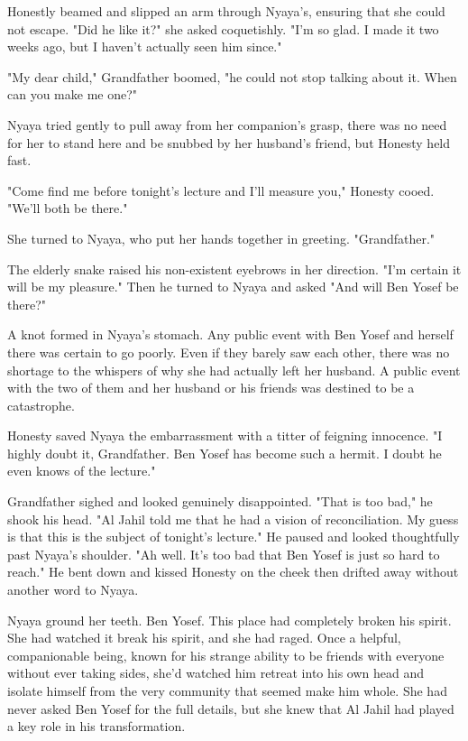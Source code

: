 \documentclass{amsart}
\begin{document}
Honestly beamed and slipped an arm through Nyaya's, ensuring that she could not escape. "Did he like it?" she asked coquetishly. "I'm so glad. I made it two weeks ago, but I haven't actually seen him since."

"My dear child," Grandfather boomed, "he could not stop talking about it. When can you make me one?"

Nyaya tried gently to pull away from her companion's grasp, there was no need for her to stand here and be snubbed by her husband's friend, but Honesty held fast. 

"Come find me before tonight's lecture and I'll measure you," Honesty cooed. "We'll both be there." 

She turned to Nyaya, who put her hands together in greeting. "Grandfather." 

The elderly snake raised his non-existent eyebrows in her direction. "I'm certain it will be my pleasure." Then he turned to Nyaya and asked "And will Ben Yosef be there?"

A knot formed in Nyaya's stomach. Any public event with Ben Yosef and herself there was certain to go poorly. Even if they barely saw each other, there was no shortage to the whispers of why she had actually left her husband. A public event with the two of them and her husband or his friends was destined to be a catastrophe. 

Honesty saved Nyaya the embarrassment with a titter of feigning innocence. "I highly doubt it, Grandfather. Ben Yosef has become such a hermit. I doubt he even knows of the lecture." 

Grandfather sighed and looked genuinely disappointed. "That is too bad," he shook his head. "Al Jahil told me that he had a vision of reconciliation. My guess is that this is the subject of tonight's lecture." He paused and looked thoughtfully past Nyaya's shoulder. "Ah well. It's too bad that Ben Yosef is just so hard to reach." He bent down and kissed Honesty on the cheek then drifted away without another word to Nyaya.

Nyaya ground her teeth. Ben Yosef. This place had completely broken his spirit. She had watched it break his spirit, and she had raged. Once a helpful, companionable being, known for his strange ability to be friends with everyone without ever taking sides, she'd watched him retreat into his own head and isolate himself from the very community that seemed make him whole. She had never asked Ben Yosef for the full details, but she knew that Al Jahil had played a key role in his transformation. 
\end{document}

